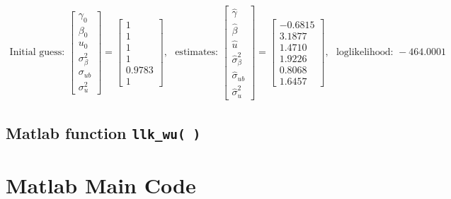 \documentclass[11pt,letter]{article}
\newcommand{\bmat}[1]{\begin{bmatrix} #1 \end{bmatrix}}%
\newcommand{\code}[1]{\texttt{#1}}
\begin{document}
\begin{align*}
\text{Initial guess: }
\bmat{\gamma_0 \\ \beta_0  \\ u_0 \\ \sigma_\beta^2 \\ \sigma_{ub}\\ \sigma_u^2} 
=\bmat{1 \\ 1  \\ 1 \\ 1 \\ 0.9783 \\ 1}, \ \ \  
\text{estimates: }
\bmat{\hat{\gamma} \\ \hat{\beta}  \\ \hat{u} \\ \hat{\sigma}_\beta^2 \\ \hat{\sigma}_{ub}\\ \hat{\sigma}_u^2} 
=\bmat{-0.6815 \\ 3.1877  \\ 1.4710 \\ 1.9226 \\ 0.8068 \\ 1.6457}, \ \ \ 
\text{loglikelihood: }-464.0001
\end{align*}


\subsection*{Matlab function \code{llk\_wu( )}}


\section*{Matlab Main Code}

\end{document}
